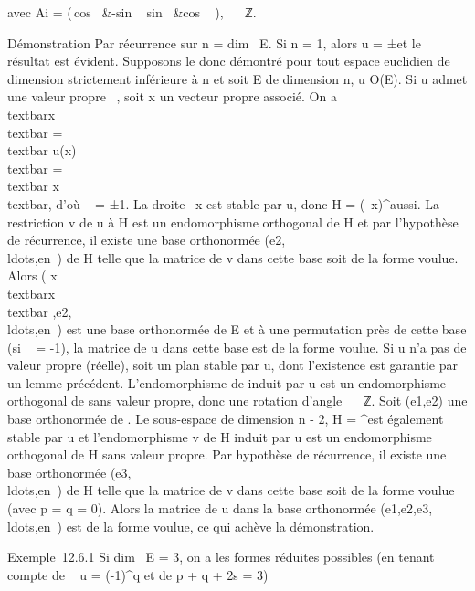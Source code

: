 avec Ai = \left
(\matrix\,cos~
\thetai&-sin \thetai~
\cr sin~
\thetai&cos \thetai~
\right ), \thetai \in {}~ \pi~ℤ.

Démonstration Par récurrence sur n = dim~ E. Si
n = 1, alors u = ±\mathrmIdE et le résultat
est évident. Supposons le donc démontré pour tout espace euclidien de
dimension strictement inférieure à n et soit E de dimension n, u \in O(E).
Si u admet une valeur propre \lambda~, soit x un vecteur propre associé. On a
\textbar{}\lambda~\textbar{}\\textbar{}x\\textbar{}
=\\textbar{} u(x)\\textbar{}
=\\textbar{} x\\textbar{}, d'où \lambda~ = ±1. La
droite ~x est stable par u, donc H = (~x)^\bot aussi. La
restriction v de u à H est un endomorphisme orthogonal de H et par
l'hypothèse de récurrence, il existe une base orthonormée
(e2,\\ldots,en~)
de H telle que la matrice de v dans cette base soit de la forme voulue.
Alors ( x \over
\\textbar{}x\\textbar{}
,e2,\\ldots,en~)
est une base orthonormée de E et à une permutation près de cette base
(si \lambda~ = -1), la matrice de u dans cette base est de la forme voulue. Si
u n'a pas de valeur propre (réelle), soit \Pi un plan stable par u, dont
l'existence est garantie par un lemme précédent. L'endomorphisme de \Pi
induit par u est un endomorphisme orthogonal de \Pi sans valeur propre,
donc une rotation d'angle  \in {}~ \diagdown \pi~ℤ. Soit
(e1,e2) une base orthonormée de \Pi. Le sous-espace de
dimension n - 2, H = \Pi^\bot est également stable par u et
l'endomorphisme v de H induit par u est un endomorphisme orthogonal de H
sans valeur propre. Par hypothèse de récurrence, il existe une base
orthonormée
(e3,\\ldots,en~)
de H telle que la matrice de v dans cette base soit de la forme voulue
(avec p = q = 0). Alors la matrice de u dans la base orthonormée
(e1,e2,e3,\\ldots,en~)
est de la forme voulue, ce qui achève la démonstration.

Exemple~12.6.1 Si dim~ E = 3, on a les formes
réduites possibles (en tenant compte de
~ u =
(-1)^q et de p + q + 2s = 3)

